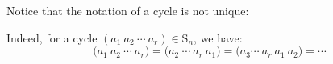 \documentclass[11pt,dvipsnames]{book}
\numberwithin{figure}{section} %
\numberwithin{table}{section} %
\begin{document}
%
%
%
%
%
%
%
%
%
%
%

Notice that the notation of a cycle is not unique:


 Indeed, for a cycle $(a_{1}\ a_{2}\ \cdots\
a_{r})\in\mathrm{S}_n$, we have:
\begin{equation}
\label{e:rotations}
\big(a_{1}\ a_{2}\ \cdots\ a_{r}\big)=\big(a_{2}\ \cdots\ a_{r}\ a_{1}\big)=\big(a_{3}\cdots\ a_{r}\ a_{1}\ a_{2}\big)=\cdots%
\end{equation}
\end{document}
